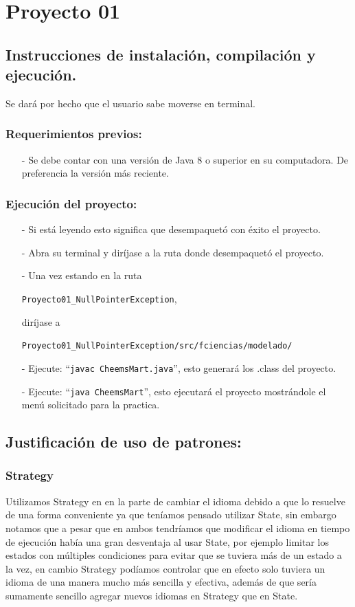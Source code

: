 \documentclass{article}
\newcommand{\code}[1]{\textcolor{white!25!black}{\texttt{#1}}}
\begin{document}

\section*{\LARGE{Proyecto 01}}

\subsection*{Instrucciones de instalación, compilación y ejecución.}
Se dará por hecho que el usuario sabe moverse en terminal.
\subsubsection*{Requerimientos previos:}
\begin{itemize}
\item[-] Se debe contar con una versión de Java $8$ o superior en su computadora. De preferencia la versión más reciente.
\end{itemize}

\subsubsection*{Ejecución del proyecto:}
\begin{itemize}
\item[-] Si está leyendo esto significa que desempaquetó con éxito el proyecto.
\item[-] Abra su terminal y diríjase a la ruta donde desempaquetó el proyecto.
\item[-] Una vez estando en la ruta
  
  \code{Proyecto01\_NullPointerException},
  
  diríjase a

  \code{Proyecto01\_NullPointerException/src/fciencias/modelado/}
\item[-] Ejecute: “\code{javac CheemsMart.java}”, esto generará los .class del proyecto.
\item[-] Ejecute: “\code{java CheemsMart}”, esto ejecutará el proyecto mostrándole el menú solicitado para la practica.
\end{itemize}
\newpage
\subsection*{Justificación de uso de patrones:}
\subsubsection*{Strategy}
Utilizamos Strategy en en la parte de cambiar el idioma debido a que lo resuelve
de una forma conveniente ya que teníamos pensado utilizar State, sin embargo notamos
que a pesar que en ambos tendríamos que modificar el idioma en tiempo de ejecución
había una gran desventaja al usar State, por ejemplo limitar los estados con múltiples
condiciones para evitar que se tuviera más de un estado a la vez, en cambio Strategy
podíamos controlar que en efecto solo tuviera un idioma de una manera mucho más sencilla
y efectiva, además de que sería sumamente sencillo agregar nuevos idiomas en Strategy
que en State.
\end{document}
